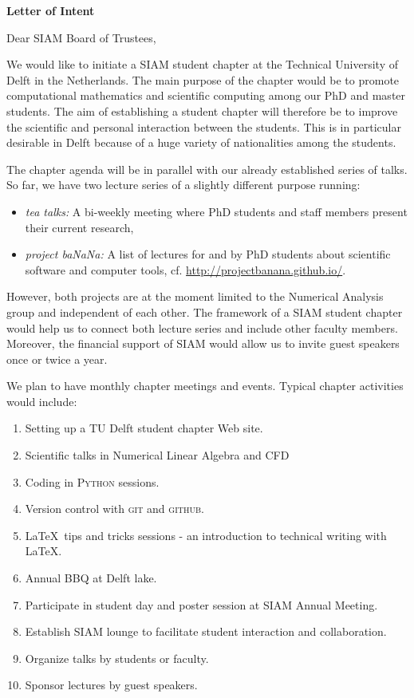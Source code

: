 \documentclass[letterpaper,12pt]{letter}
\begin{document}
\begin{letter}{\textbf{Letter of Intent}}

\opening{Dear SIAM Board of Trustees,}

We would like to initiate a SIAM student chapter at the Technical University of Delft in the Netherlands. The main purpose of the chapter would be to promote computational mathematics and scientific computing among our PhD and master students. The aim of establishing a student chapter will therefore be to improve the scientific and personal interaction between the students. This is in particular desirable in Delft because of a huge variety of nationalities among the students. 

The chapter agenda will be in parallel with our already established series of talks. So far, we have two lecture series of a slightly different purpose running:
\begin{itemize}
 \item \textit{tea talks:} A bi-weekly meeting where PhD students and staff members present their current research,
 \item \textit{project baNaNa:} A list of lectures for and by PhD students about scientific software and computer tools, cf. \href{http://projectbanana.github.io/}{http://projectbanana.github.io/}.
\end{itemize}
However, both projects are at the moment limited to the Numerical Analysis group and independent of each other. The framework of a SIAM student chapter would help us to connect both lecture series and include other faculty members. Moreover, the financial support of SIAM would allow us to invite guest speakers once or twice a year.

We plan to have monthly chapter meetings and events. Typical chapter activities would include:
\begin{enumerate}
\item Setting up a TU Delft student chapter Web site.
\item Scientific talks in Numerical Linear Algebra and CFD
\item Coding in \textsc{Python} sessions.
\newpage
\item Version control with \textsc{git} and \textsc{github}.
\item \LaTeX \ tips and tricks sessions - an introduction to technical writing with \LaTeX.
\item Annual BBQ at Delft lake.
\item Participate in student day and poster session at SIAM Annual Meeting.
\item Establish SIAM lounge to facilitate student interaction and collaboration.
\item Organize talks by students or faculty.
\item Sponsor lectures by guest speakers.
\end{enumerate}


\end{letter}
\end{document}
